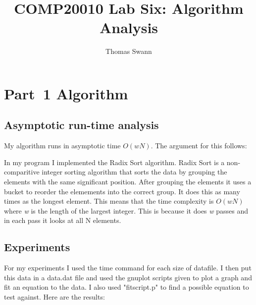 \documentclass{article}
\title{COMP20010 Lab Six: Algorithm Analysis}
\author{Thomas Swann}
\begin{document}
\maketitle

\section{Part~1 Algorithm}
\label{sec:algorithm1}

\subsection{Asymptotic run-time analysis}

My algorithm runs in asymptotic time $O(wN)$. The argument for this follows:

In my program I implemented the Radix Sort algorithm. Radix Sort is a non-comparitive integer sorting algorithm that sorts the data by grouping the elements with the same significant position. After grouping the elements it uses a bucket to reorder the elemements into the correct group. It does this as many times as the longest element. This means that the time complexity is $O(wN)$ where \textit{w} is the length of the largest integer. This is because it does \textit{w} passes and in each pass it looks at all N elements.

\subsection{Experiments}
\label{sec:experiments1}
For my experiments I used the time command for each size of datafile. I then put this data in a data.dat file and used the gnuplot scripts given to plot a graph and fit an equation to the data. I also used "fitscript.p" to find a possible equation to test against. Here are the results:

\end{document}
